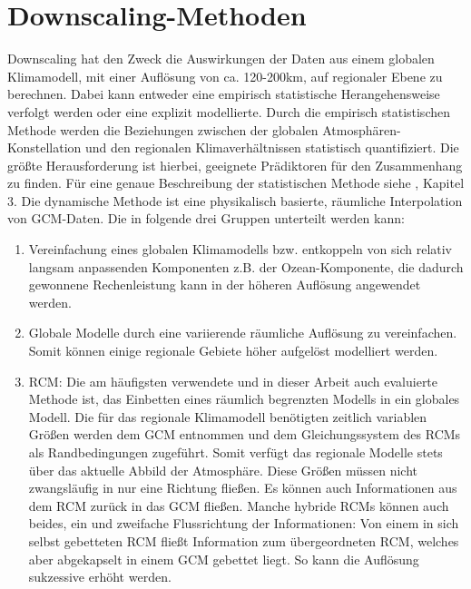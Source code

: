 \section{Downscaling-Methoden}
Downscaling hat den Zweck die Auswirkungen der Daten aus einem globalen Klimamodell, mit einer Auflösung von ca. 120-200km, auf regionaler Ebene zu berechnen. Dabei kann entweder eine empirisch statistische Herangehensweise verfolgt werden oder eine explizit modellierte. Durch die empirisch statistischen Methode werden die Beziehungen zwischen der globalen Atmosphären-Konstellation und den regionalen Klimaverhältnissen statistisch quantifiziert. Die größte Herausforderung ist hierbei, geeignete Prädiktoren für den Zusammenhang zu finden. Für eine genaue Beschreibung der statistischen Methode siehe \cite{RCM}, Kapitel 3. Die dynamische Methode ist eine
physikalisch basierte, räumliche Interpolation von GCM-Daten. Die in folgende drei Gruppen unterteilt werden kann:
\begin{enumerate}[label=(\alph*)]
	\item Vereinfachung eines globalen Klimamodells bzw. entkoppeln von sich relativ langsam anpassenden Komponenten z.B. der Ozean-Komponente, die dadurch gewonnene Rechenleistung kann in der höheren Auflösung angewendet werden.
	\item Globale Modelle durch eine variierende räumliche Auflösung zu vereinfachen. Somit können einige regionale Gebiete höher aufgelöst modelliert werden.
	\item RCM: Die am häufigsten verwendete und in dieser Arbeit auch evaluierte Methode ist, das Einbetten eines räumlich begrenzten Modells in ein globales Modell. Die für das regionale Klimamodell benötigten zeitlich variablen Größen werden dem GCM entnommen und dem Gleichungssystem des RCMs als Randbedingungen zugeführt. Somit verfügt das regionale Modelle stets über das aktuelle Abbild der Atmosphäre. Diese Größen müssen nicht zwangsläufig in nur eine Richtung fließen. Es können auch Informationen aus dem RCM zurück in das GCM fließen. Manche hybride RCMs können auch beides, ein und zweifache Flussrichtung der Informationen: Von einem in sich selbst gebetteten RCM fließt Information zum übergeordneten RCM, welches aber abgekapselt in einem GCM gebettet liegt. So kann die Auflösung sukzessive erhöht werden. 
\end{enumerate}
